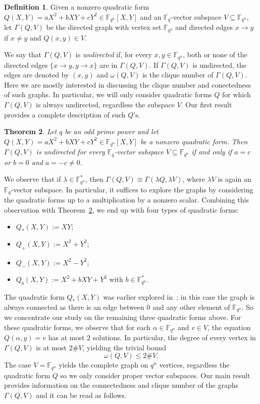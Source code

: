 \documentclass[11pt]{amsart}
\newcommand{\G}{\Gamma}
\newcommand{\F}{\mathbb F}
\newtheorem{theorem}{Theorem}[section]
\theoremstyle{definition}
\newtheorem{definition}[theorem]{Definition}
\theoremstyle{remark}
\begin{document}
\begin{definition}
    Given a nonzero quadratic form $Q(X, Y)=aX^2+bXY+cY^2\in \F_{q^n}[X, Y]$ and an $\F_q$-vector subspace $V\subseteq \F_{q^n}$, let $\G(Q, V)$ be the directed graph with vertex set $\F_{q^n}$ and directed edges $x\to y$ if $x\ne y$ and $Q(x, y)\in V$. 
\end{definition}
We say that $\G(Q, V)$  is {\em undirected} if, for every $x, y\in \F_{q^n}$, both or none of the directed edges $\{x\to y, y\to x\}$ are in $\G(Q, V)$. If $\G(Q, V)$ is undirected, the edges are denoted by $(x, y)$ and $\omega(Q, V)$ is the clique number of $\G(Q, V)$. Here we are mostly interested in discussing the clique number and conectedness of such graphs. In particular, we will only consider quadratic forms $Q$ for which $\G(Q, V)$ is always undirected, regardless the subspace $V$. Our first result provides a complete description of such $Q$'s. 


\begin{theorem}\label{thm:first}
    Let $q$ be an odd prime power and let $Q(X, Y)=aX^2+bXY+cY^2\in \F_{q^n}[X, Y]$ be a nonzero quadratic form. Then $\G(Q, V)$ is undirected for every $\F_q$-vector subspace $V\subseteq \F_{q^n}$ if and only if $a=c$ or $b=0$ and $a=-c\ne 0$. 
\end{theorem}

We observe that if $\lambda \in \F_{q^n}^*$, then $\Gamma(Q, V)\cong \Gamma(\lambda Q, \lambda V)$, where $\lambda V$ is again an $\F_q$-vector subspace. In particular, it suffices to explore the graphs by considering the quadratic forms up to a multiplication by a nonzero scalar. Combining this observation with Theorem~\ref{thm:first}, we end up with four types of quadratic forms:
\begin{itemize}
\item $Q_*(X, Y):=XY$;
    \item $Q_+(X, Y):=X^2+Y^2$;
    \item $Q_-(X, Y):=X^2-Y^2$;
    \item $Q_b(X, Y):=X^2+bXY+Y^2$ with $b\in \F_{q^n}^*$. 
\end{itemize}
The quadratic form $Q_*(X, Y)$ was earlier explored in~\cite{reis2}; in this case the graph is always connected as there is an edge between $0$ and any other element of $\F_{q^n}$. So we concentrate our study on the remaining three quadratic forms above. 
For these quadratic forms, we observe that for each $\alpha\in \F_{q^n}$ and $v\in V$, the equation $Q(\alpha, y)=v$ has at most $2$ solutions. In particular, the degree of every vertex in $\G(Q, V)$ is at most $2\# V$, yielding the trivial bound 
$$\omega(Q, V)\le 2\# V.$$ 
The case $V=\F_{q^n}$ yields the complete graph on $q^n$ vertices, regardless the quadratic form $Q$ so we only consider proper vector subspaces.
Our main result provides information on the connectedness and clique number of the graphs $\G(Q, V)$ and it can be read as follows.
\end{document}
